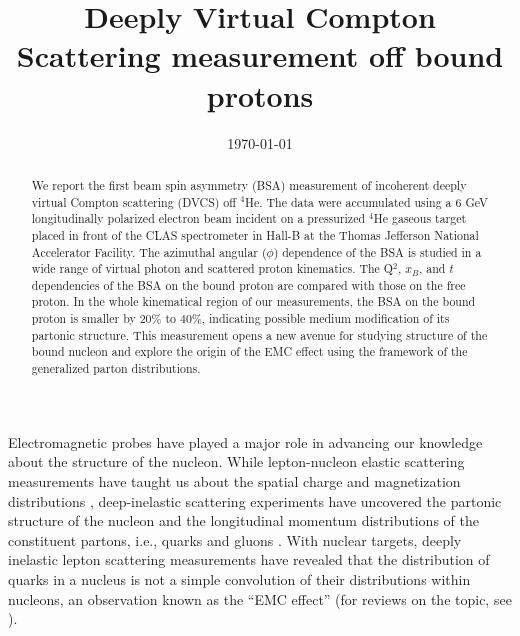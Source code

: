 \documentclass[twocolumn,nofootinbib,showpacs,prl,superscriptaddress,secnumarabic,amssymb,nobibnotes,aps,floatfix]{revtex4}
\begin{document}
\linenumbers

\title{Deeply Virtual Compton Scattering measurement off bound protons}



\date{\today}
\begin{abstract}
 We report the first beam spin asymmetry (BSA) measurement of incoherent deeply 
   virtual Compton scattering (DVCS) off $^4$He. The data were accumulated 
   using a 6 GeV longitudinally polarized electron beam incident on a 
   pressurized $^4$He gaseous target placed in front of the CLAS spectrometer 
   in Hall-B at the Thomas Jefferson National Accelerator Facility. The 
   azimuthal angular ($\phi$) dependence of the BSA is studied in a wide range 
   of virtual photon and scattered proton kinematics. The Q$^2$, $x_B$, and $t$ 
   dependencies of the BSA on the bound proton are compared with those on the 
   free proton. In the whole kinematical region of our measurements, the BSA on 
   the bound proton is smaller by $20\%$ to $40\%$, indicating possible medium 
   modification of its partonic structure. This measurement opens a new avenue 
   for studying structure of the bound nucleon and explore the origin of the 
   EMC effect using the framework of the generalized parton distributions.

\end{abstract}

\maketitle 

Electromagnetic probes have played a major role in advancing our knowledge 
about the structure of the nucleon. While lepton-nucleon elastic scattering 
measurements have 
taught us about the spatial charge and magnetization distributions 
\cite{Hofstadter:1955ae,Perdrisat:2006hj}, deep-inelastic scattering 
experiments have uncovered the partonic structure of the nucleon and 
the longitudinal momentum distributions of the constituent partons, i.e., 
quarks and gluons \cite{pdg}.  With nuclear targets, deeply inelastic lepton 
scattering measurements have revealed that the distribution of quarks in a 
nucleus is not a simple convolution of their distributions within nucleons, an 
observation known as the ``EMC effect''\cite{EMC_first} (for reviews on the 
topic, see  \cite{Arneodo:1992wf,Geesaman:1995yd,Norton:2003cb,Hen:2016kwk}).
\end{document}

